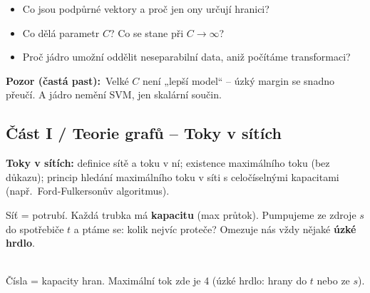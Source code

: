\documentclass[11pt,a4paper]{article}
\newcommand{\ucivo}{\par\vspace{1pt}\noindent{\footnotesize\itshape\color{intugreen!60!black}Učivo (jak na to):}\par\nopagebreak\vspace{1pt}}
\newcommand{\past}[1]{\par\smallskip\noindent\textbf{\color{gapred}Pozor (častá past):}~#1\par\smallskip}
\begin{document}
\begin{recall}
\begin{itemize}[leftmargin=1.2em,itemsep=0pt,topsep=1pt]
  \item Co jsou podpůrné vektory a proč jen ony určují hranici?
  \item Co dělá parametr $C$? Co se stane při $C\to\infty$?
  \item Proč jádro umožní oddělit neseparabilní data, aniž počítáme transformaci?
\end{itemize}
\end{recall}
\past{Velké $C$ není „lepší model“ -- úzký margin se snadno přeučí. A jádro nemění SVM, jen skalární součin.}

\subsection*{Část I / Teorie grafů -- Toky v sítích}

\begin{tema}
\textbf{Toky v sítích:} definice sítě a toku v ní; existence maximálního toku (bez důkazu);
princip hledání maximálního toku v síti s celočíselnými kapacitami (např.\ Ford-Fulkersonův algoritmus).
\end{tema}

\ucivo
\begin{intuice}
Síť = potrubí. Každá trubka má \textbf{kapacitu} (max průtok). Pumpujeme ze zdroje $s$ do
spotřebiče $t$ a ptáme se: kolik nejvíc proteče? Omezuje nás vždy nějaké \textbf{úzké hrdlo}.
\end{intuice}

\begin{center}
\\[-2pt]
{\scriptsize Čísla = kapacity hran. Maximální tok zde je 4 (úzké hrdlo: hrany do $t$ nebo ze $s$).}
\end{center}
\end{document}

